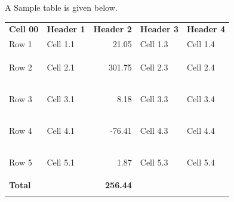 \documentclass{article}%
\newcommand\margincomment[1]{\RaggedRight{\marginpar{\hsize1.7in\tiny\color{mccol}{#1}}}}%
\begin{document}
%
A Sample table is given below.%
\par%
\vspace{0.5\baselineskip}%
\begin{longtable}[c]{llrll}%
\arrayrulecolor{cornflowerblue}%
\hline%
\rowcolor{babyblueeyes!60}%

\small{\color{darkblue}%
\textsf{\textbf{Cell 00}}}&
\small{\color{darkblue}%
\textsf{\textbf{Header 1}}}&
\small{\color{darkblue}%
\textsf{\textbf{Header 2}}}&
\small{\color{darkblue}%
\textsf{\textbf{Header 3}}}&
\small{\color{darkblue}%
\textsf{\textbf{Header 4}}}\\%
\arrayrulecolor{cornflowerblue}%
\hline%
\hypertarget{ID:678039943}{}%
\hypertarget{ID:1168632952}{}%
\hypertarget{ID:841339020}{}%
\hypertarget{ID:1488382579}{}%
\hypertarget{ID:182723351}{}%
\small{Row 1}&\small{Cell 1.1}&\small{21.05}&\small{Cell 1.3}&\small{Cell 1.4}\\%
\hypertarget{ID:398741834}{}%
\hypertarget{ID:1442058181}{}%
\hypertarget{ID:1264376687}{}%
\hypertarget{ID:704670966}{}%
\hypertarget{ID:1237494604}{}%
\small{Row 2}&\small{Cell 2.1}&\small{301.75}&\small{Cell 2.3}&\small{Cell 2.4}\\%
\hypertarget{ID:59339138}{}%
\hypertarget{ID:1323387877}{}%
\hypertarget{ID:1804861774}{}%
\hypertarget{ID:1219827303}{}%
\hypertarget{ID:364534120}{}%
\small{Row 3}&\small{Cell 3.1}&\small{8.18}&\small{Cell 3.3}&\small{Cell 3.4}\\%
\hypertarget{ID:1979086283}{}%
\hypertarget{ID:1041448954}{}%
\hypertarget{ID:1861374801}{}%
\hypertarget{ID:1934932066}{}%
\hypertarget{ID:295475780}{}%
\small{Row 4}&\small{Cell 4.1}&\small{{-}76.41}&\small{Cell 4.3}&\small{Cell 4.4}\\%
\hypertarget{ID:1999442722}{}%
\hypertarget{ID:1587946401}{}%
\hypertarget{ID:19115582}{}%
\hypertarget{ID:117214824}{}%
\hypertarget{ID:747637555}{}%
\small{Row 5}&\small{Cell 5.1}&\small{1.87}&\small{Cell 5.3}&\small{Cell 5.4}\\%
\arrayrulecolor{cornflowerblue}%
\hline%
\rowcolor{babyblueeyes!10}%

\small{\color{darkblue}%
\textsf{\textbf{Total}}}&&
\small{\color{darkblue}%
\textsf{\textbf{256.44}}}&&\\%
\arrayrulecolor{cornflowerblue}%
\hline%
\end{longtable}%
\margincomment{\tiny{$\Lsh$ \hyperlink{ID:59339138}{Row 3}}}%
\end{document}
